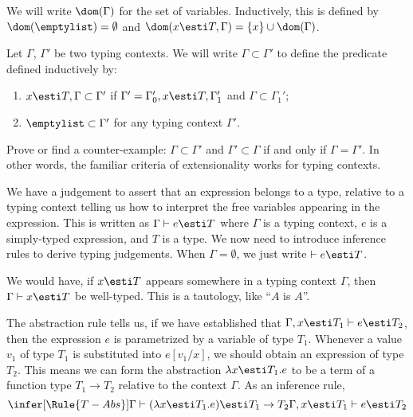 \begin{node}[Syntax]
\begin{definition}
\begin{node}\label{stlc-000E}%
We will write $\dom(\Gamma)$ for the set of variables. Inductively, this
is defined by $\dom(\emptylist)=\emptyset$ and $\dom(x\esti T,\Gamma)=\{x\}\cup\dom(\Gamma)$.
\end{node}

\begin{node}\label{stlc-000F}%
Let $\Gamma$, $\Gamma'$ be two typing contexts. We will write
$\Gamma\subset\Gamma'$ to define the predicate defined inductively by:
\begin{enumerate}
\item $x\esti T,\Gamma\subset \Gamma'$ if $\Gamma'=\Gamma_{0}',x\esti T,\Gamma_{1}'$
  and $\Gamma\subset\Gamma_{1}'$;
\item $\emptylist\subset\Gamma'$ for any typing context $\Gamma'$.
\end{enumerate}
\end{node}

\begin{node}[Exercise]\label{stlc-000G}%
Prove or find a counter-example: $\Gamma\subset\Gamma'$ and
$\Gamma'\subset\Gamma$ if and only if $\Gamma=\Gamma'$. In other words,
the familiar criteria of extensionality works for typing contexts.
\end{node}
\end{definition}

\begin{node}\label{stlc-0007}%
We have a judgement to assert that an expression belongs to a type,
relative to a typing context telling us how to interpret the free
variables appearing in the expression. This is written as
$\Gamma\vdash e\esti T$ where $\Gamma$ is a typing context, $e$ is a
simply-typed expression, and $T$ is a type. We now need to introduce
inference rules to derive typing judgements. When $\Gamma=\emptyset$, we
just write $\vdash e\esti T$.

\begin{node}\label{stlc-000A}%
We would have, if $x\esti T$ appears somewhere in a typing context
$\Gamma$, then $\Gamma\vdash x\esti T$ be well-typed. This is a
tautology, like ``$A$ is $A$''.
\end{node}

\begin{node}\label{stlc-000B}%
The abstraction rule tells us, if we have established that
$\Gamma,x\esti T_{1}\vdash e\esti T_{2}$, then the expression $e$ is
parametrized by a variable of type $T_{1}$. Whenever a value $v_{1}$ of type
$T_{1}$ is substituted into $e[v_{1}/x]$, we should obtain an expression
of type $T_{2}$. This means we can form the abstraction $\lambda x\esti T_{1}.e$
to be a term of a function type $T_{1}\to T_{2}$ relative to the context
$\Gamma$. As an inference rule,
\begin{equation}
\infer[\Rule{T-Abs}]{\Gamma\vdash(\lambda x\esti T_{1}.e)\esti T_{1}\to T_{2}}{%
\Gamma,x\esti T_{1}\vdash e\esti T_{2}}
\end{equation}
\end{node}


\end{node}
\end{node}
